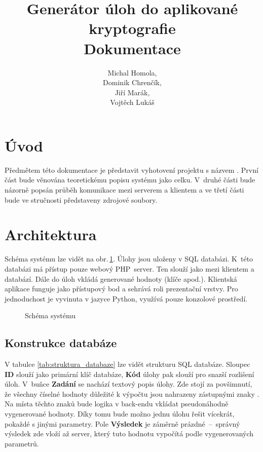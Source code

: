 \documentclass[titlepage]{article}
\title{Generátor úloh do aplikované kryptografie\\Dokumentace}
\author{Michal Homola,\\Dominik Chrenčík,\\Jiří Marák,\\Vojtěch Lukáš}
\begin{document}
\maketitle

\tableofcontents

\section*{Úvod}
Předmětem této dokumentace je představit vyhotovení projektu s názvem . První část bude věnována teoretickému popisu systému jako celku. V~druhé části bude názorně popsán průběh komunikace mezi serverem a klientem a ve třetí části bude ve stručnosti představeny zdrojové soubory. 

\section{Architektura}
Schéma systému lze vidět na obr.\,\ref{fig:sys}. Úlohy jsou uloženy v SQL databázi. K~této databázi má přístup pouze webový PHP~server. Ten slouží jako  mezi klientem a databází. Dále do úloh vkládá generované hodnoty (klíče apod.).
Klientská aplikace funguje jako přístupový bod a sehrává roli prezentační vrstvy. Pro jednoduchost je vyvinuta v jazyce Python, využívá pouze konzolové pro\-středí. 
\begin{figure}[h!]
    \centering
        
    \caption{Schéma systému}
    \label{fig:sys}
\end{figure}

\subsection{Konstrukce databáze}
V tabulce \ref{tab:struktura_databaze} lze vidět strukturu SQL databáze. 
Sloupec \textbf{ID} slouží jako primární klíč databáze, \textbf{Kód} úlohy pak slouží pro snazší rozlišení úloh. V~buňce \textbf{Zadání} se nachází textový popis úlohy. Zde stojí za povšimnutí, že všechny číselné hodnoty důležité k výpočtu jsou nahrazeny zástupnými znaky . 
Na místa těchto znaků bude logika v back-endu vkládat pseudonáhodně vygenerované hodnoty. Díky tomu bude možno jednu úlohu řešit vícekrát, po\-kaž\-dé s jinými parametry. 
Pole \textbf{Výsledek} je záměrně prázdné~--~správný výsledek zde vloží až server, který tuto hodnotu vypočítá podle vygenerovaných parametrů. 
\end{document}
